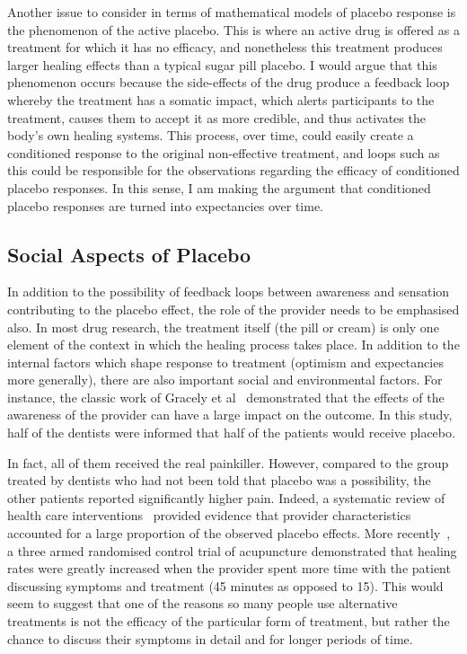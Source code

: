 Another issue to consider in terms of mathematical models of placebo response is the phenomenon of the active placebo. This is where an active drug is offered as a treatment for which it has no efficacy, and nonetheless this treatment produces larger healing effects than a typical sugar pill placebo. I would argue that this phenomenon occurs because the side-effects of the drug produce  a feedback loop whereby the treatment has a somatic impact, which alerts participants to the treatment, causes them to accept it as more credible, and thus activates the body's own healing systems. This process, over time, could easily create a conditioned response to the original non-effective treatment, and loops such as this could be responsible for the observations regarding the efficacy of conditioned placebo responses. In this sense, I am making the argument that conditioned placebo responses are turned into expectancies over time.   


\subsection{Social Aspects of Placebo}

In addition to the possibility of feedback loops between awareness and sensation contributing to the placebo effect, the role of the provider needs to be emphasised also. In most drug research, the treatment itself (the pill or cream) is only one element of the context in which the healing process takes place. In addition to the internal factors which shape response to treatment (optimism and expectancies more generally), there are also important social and environmental factors. For instance, the classic work of Gracely et al~\cite{Gracely1985} demonstrated that the effects of the awareness of the provider can have a large impact on the outcome. In this study, half of the dentists were informed that half of the patients would receive placebo. 

In fact, all of them received the real painkiller. However, compared to the group treated by dentists who had not been told that placebo was a possibility, the other patients reported significantly higher pain. Indeed, a systematic review of health care interventions~\cite{DiBlasi2001} provided evidence that provider characteristics accounted for a large proportion of the observed placebo effects. More recently~\cite{Kaptchuk2008}, a three armed randomised control trial of acupuncture demonstrated that healing rates were greatly increased when the provider spent more time with the patient discussing symptoms and treatment (45 minutes as opposed to 15). This would seem to suggest that one of the reasons so many people use alternative treatments is not the efficacy of the particular form of treatment, but rather the chance to discuss their symptoms in detail and for longer periods of time.

